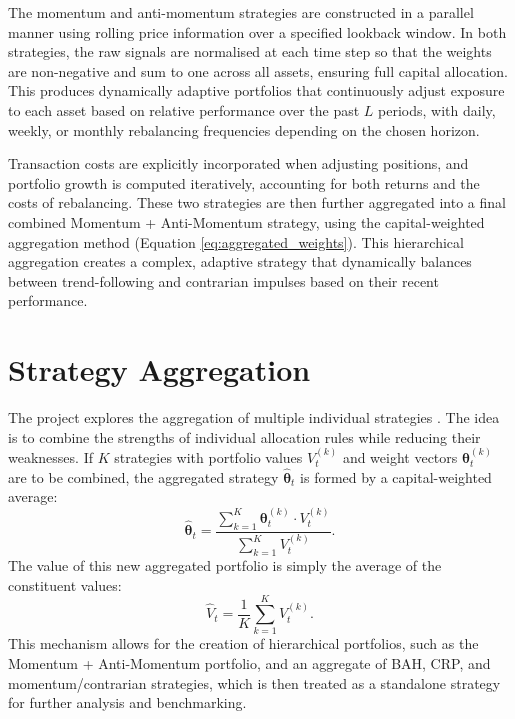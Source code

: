 \documentclass[12pt,a4paper]{report}
\begin{document}
The momentum and anti-momentum strategies are constructed in a parallel manner using rolling price information over a specified lookback window. In both strategies, the raw signals are normalised at each time step so that the weights are non-negative and sum to one across all assets, ensuring full capital allocation. This produces dynamically adaptive portfolios that continuously adjust exposure to each asset based on relative performance over the past \( L \) periods, with daily, weekly, or monthly rebalancing frequencies depending on the chosen horizon. 

Transaction costs are explicitly incorporated when adjusting positions, and portfolio growth is computed iteratively, accounting for both returns and the costs of rebalancing. These two strategies are then further aggregated into a final combined Momentum + Anti-Momentum strategy, using the capital-weighted aggregation method (Equation \ref{eq:aggregated_weights}). This hierarchical aggregation creates a complex, adaptive strategy that dynamically balances between trend-following and contrarian impulses based on their recent performance.

\section{Strategy Aggregation}
\label{sec:aggregation}

The project explores the aggregation of multiple individual strategies \citep{Cover1991}. The idea is to combine the strengths of individual allocation rules while reducing their weaknesses. If \( K \) strategies with portfolio values \( V_t^{(k)} \) and weight vectors \( \boldsymbol{\theta}_t^{(k)} \) are to be combined, the aggregated strategy \( \widehat{\boldsymbol{\theta}}_t \) is formed by a capital-weighted average:
\begin{equation}
\widehat{\boldsymbol{\theta}}_t = \frac{ \sum_{k=1}^{K} \boldsymbol{\theta}_t^{(k)} \cdot V_t^{(k)} }{ \sum_{k=1}^{K} V_t^{(k)} }.
\label{eq:aggregated_weights}
\end{equation}
The value of this new aggregated portfolio is simply the average of the constituent values:
\begin{equation}
\widehat{V}_t = \frac{1}{K} \sum_{k=1}^{K} V_t^{(k)}.
\label{eq:aggregated_value}
\end{equation}
This mechanism allows for the creation of hierarchical portfolios, such as the Momentum + Anti-Momentum portfolio, and an aggregate of BAH, CRP, and momentum/contrarian strategies, which is then treated as a standalone strategy for further analysis and benchmarking.
\end{document}
